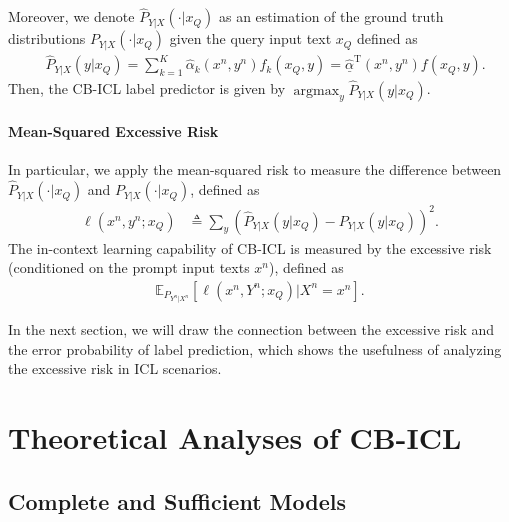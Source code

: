 \documentclass{article} %
\theoremstyle{plain} %
\begin{document}
Moreover, we denote $\hat{P}_{Y|X} (\cdot|x_Q)$ as an estimation of the ground truth distributions $P_{Y|X}(\cdot|x_Q)$ given the query input text $x_Q$ defined as
\begin{align*}
&\hat{P}_{Y|X} (y|x_Q) =  \sum_{k=1}^K \hat{\alpha}_k (x^n,y^n) f_k(x_Q,y) =  \underline{\hat{\alpha}}^{\text{T}} (x^n,y^n) f(x_Q,y).
\end{align*}
Then, the CB-ICL label predictor is given by $\mathop{\arg\max}_{y} \hat{P}_{Y|X} (y|x_Q)$.

\paragraph{Mean-Squared Excessive Risk}

In particular, we apply the mean-squared risk to measure the difference between $\hat{P}_{Y|X} (\cdot|x_Q)$ and $P_{Y|X}(\cdot|x_Q)$, defined as
\begin{align*}
\ell \left(x^n,y^n;x_Q\right)& \triangleq \sum_{y} \left(\hat{P}_{Y|X}(y|x_Q) -  P_{Y|X}(y|x_Q) \right)^2.
\end{align*}
The in-context learning capability of CB-ICL is measured by the excessive risk (conditioned on the prompt input texts $x^n$), defined as
\begin{align}\label{equ:excessive_risk}
\mathbb{E}_{P_{Y^n|X^n}}\left[ 
\ell \left(x^n,Y^n;x_Q\right) | X^n = x^n\right].
\end{align}

In the next section, we will draw the connection between the excessive risk and the error probability of label prediction, which shows the usefulness of analyzing the excessive risk in ICL scenarios.

\section{Theoretical Analyses of CB-ICL}
\label{thoery}

\subsection{Complete and Sufficient Models}\label{sec:complete_sufficient}
\end{document}
